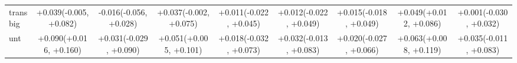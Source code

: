 \begin{table}[t]
\begin{tabular}{lcccccccc}
transbig & +0.039\newline(-0.005, +0.082) & -0.016\newline(-0.056, +0.028) & +0.037\newline(-0.002, +0.075) & +0.011\newline(-0.022, +0.045) & +0.012\newline(-0.022, +0.049) & +0.015\newline(-0.018, +0.049) & +0.049\newline(+0.012, +0.086) & +0.001\newline(-0.030, +0.032) \\
unt & +0.090\newline(+0.016, +0.160) & +0.031\newline(-0.029, +0.090) & +0.051\newline(+0.005, +0.101) & +0.018\newline(-0.032, +0.073) & +0.032\newline(-0.013, +0.083) & +0.020\newline(-0.027, +0.066) & +0.063\newline(+0.008, +0.119) & +0.035\newline(-0.011, +0.083) \\
\bottomrule
\end{tabular}
\end{table}
